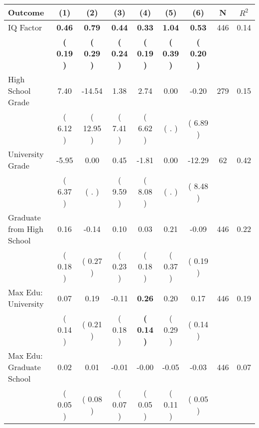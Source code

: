 \begin{tabular}{lcccccccc}
\toprule
 \textbf{Outcome} & \textbf{(1)} & \textbf{(2)} & \textbf{(3)} & \textbf{(4)} & \textbf{(5)} & \textbf{(6)} & \textbf{N} & \textbf{$ R^2$} \\
\midrule
IQ Factor & \textbf{     0.46} & \textbf{     0.79} & \textbf{     0.44} & \textbf{     0.33} & \textbf{     1.04} & \textbf{     0.53} & 446 &       0.14 \\ 
 & \textbf{(     0.19 )} & \textbf{(     0.29 )} & \textbf{(     0.24 )} & \textbf{(     0.19 )} & \textbf{(     0.39 )} & \textbf{(     0.20 )} & \\
High School Grade &      7.40 &    -14.54 &      1.38 &      2.74 &      0.00 &     -0.20 & 279 &       0.15 \\ 
 & (     6.12 ) & (    12.95 ) & (     7.41 ) & (     6.62 ) & (        . ) & (     6.89 ) & \\
University Grade &     -5.95 &      0.00 &      0.45 &     -1.81 &      0.00 &    -12.29 & 62 &       0.42 \\ 
 & (     6.37 ) & (        . ) & (     9.59 ) & (     8.08 ) & (        . ) & (     8.48 ) & \\
Graduate from High School &      0.16 &     -0.14 &      0.10 &      0.03 &      0.21 &     -0.09 & 446 &       0.22 \\ 
 & (     0.18 ) & (     0.27 ) & (     0.23 ) & (     0.18 ) & (     0.37 ) & (     0.19 ) & \\
Max Edu: University &      0.07 &      0.19 &     -0.11 & \textbf{     0.26} &      0.20 &      0.17 & 446 &       0.19 \\ 
 & (     0.14 ) & (     0.21 ) & (     0.18 ) & \textbf{(     0.14 )} & (     0.29 ) & (     0.14 ) & \\
Max Edu: Graduate School &      0.02 &      0.01 &     -0.01 &     -0.00 &     -0.05 &     -0.03 & 446 &       0.07 \\ 
 & (     0.05 ) & (     0.08 ) & (     0.07 ) & (     0.05 ) & (     0.11 ) & (     0.05 ) & \\
\bottomrule
\end{tabular}
